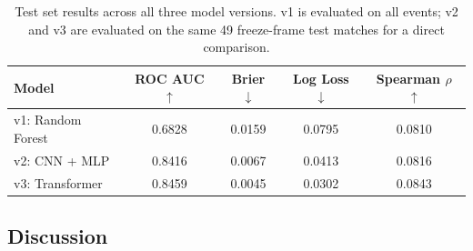 \documentclass{article}
\begin{document}
\begin{table}[h]
\centering
\caption{Test set results across all three model versions. v1 is evaluated on all events; v2 and v3 are evaluated on the same 49 freeze-frame test matches for a direct comparison.}
\begin{tabular}{lcccc}
\toprule
\textbf{Model} & \textbf{ROC AUC} $\uparrow$ & \textbf{Brier} $\downarrow$ & \textbf{Log Loss} $\downarrow$ & \textbf{Spearman $\rho$} $\uparrow$ \\
\midrule
v1: Random Forest     & 0.6828 & 0.0159 & 0.0795 & 0.0810 \\
v2: CNN + MLP         & 0.8416 & 0.0067 & 0.0413 & 0.0816 \\
v3: Transformer       & 0.8459 & 0.0045 & 0.0302 & 0.0843 \\
\bottomrule
\end{tabular}
\label{tab:results}
\end{table}

\subsection{Discussion}
\end{document}
